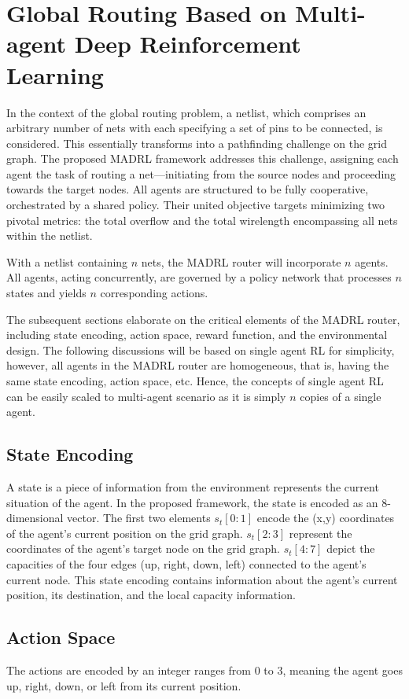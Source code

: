 \documentclass[conference]{IEEEtran}
\begin{document}
\section{Global Routing Based on Multi-agent Deep Reinforcement Learning}
In the context of the global routing problem, a netlist, which comprises an arbitrary number of nets with each specifying a set of pins to be connected, is considered. This essentially transforms into a pathfinding challenge on the grid graph. The proposed MADRL framework addresses this challenge, assigning each agent the task of routing a net—initiating from the source nodes and proceeding towards the target nodes. All agents are structured to be fully cooperative, orchestrated by a shared policy. Their united objective targets minimizing two pivotal metrics: the total overflow and the total wirelength encompassing all nets within the netlist.

With a netlist containing $n$ nets, the MADRL router will incorporate $n$ agents. All agents, acting concurrently, are governed by a policy network that processes $n$ states and yields $n$ corresponding actions.

The subsequent sections elaborate on the critical elements of the MADRL router, including state encoding, action space, reward function, and the environmental design. The following discussions will be based on single agent RL for simplicity, however, all agents in the MADRL router are homogeneous, that is, having the same state encoding, action space, etc. Hence, 
the concepts of single agent RL can be easily scaled to multi-agent scenario as it is simply $n$ copies of a single agent. 

\subsection{State Encoding}
A state is a piece of information from the environment represents the current situation of the agent. In the proposed framework, the state is encoded as an 8-dimensional vector. The first two elements $s_{t}[0:1]$ encode the (x,y) 
coordinates of the agent's current position on the grid graph. $s_{t}[2:3]$ represent the coordinates of the agent's target node on the grid graph. 
$s_{t}[4:7]$ depict the capacities of the four edges (up, right, down, left) connected to the agent's current node. This state encoding contains information about the agent's current position, its destination, and the local 
capacity information. 

\subsection{Action Space}
The actions are encoded by an integer ranges from 0 to 3, meaning the agent goes up, right, down, or left from its current position.
\end{document}
